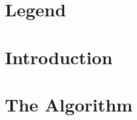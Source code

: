 


\frontmatter



\tableofcontents %
\chapter{Legend}
\newpage

\FloatBarrier

\mainmatter
\chapter{Introduction}

\chapter{The Algorithm}


%
%

%
%

